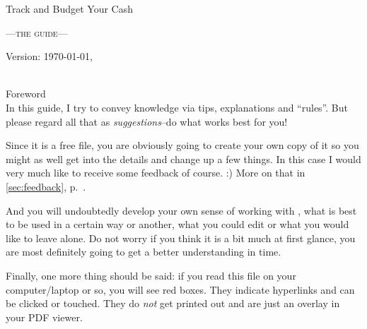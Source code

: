 
\begin{center}\LARGE
Track and Budget Your Cash
\end{center}
\begin{center}\scshape\large\sffamily
	---the guide---
\end{center}

\vfill
\begin{center}
Version: \today, \thistime
\end{center}

\clearpage
~\\
\vfill
{\sffamily\centering Foreword\label{foreword}\\}
\small\singlespacing\rmfamily
In this guide, I try to convey knowledge via tips, explanations and ``rules''.
But please regard all that as \emph{suggestions}--do what works best for you!

Since it is a free file, you are obviously going to create your own copy of it so you might as well get into the details and change up a few things. In this case I would very much like to receive some feedback of course. :)
More on that in \autoref{sec:feedback}, p.~\pageref{sec:feedback}.

And you will undoubtedly develop your own sense of working with \tfn, what is best to be used in a certain way or another, what you could edit or what you would like to leave alone.
Do not worry if you think it is a bit much at first glance, you are most definitely going to get a better understanding in time.

Finally, one more thing should be said: if you read this file on your computer/laptop or so, you will see red boxes.
They indicate hyperlinks and can be clicked or touched.
They do \emph{not} get printed out and are just an overlay in your PDF viewer.